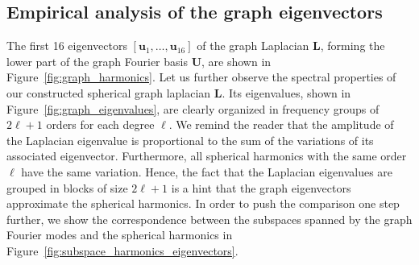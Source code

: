 \documentclass{article} %
\newcommand{\figref}[1]{Figure~\ref{fig:#1}}
\renewcommand{\b}[1]{{\bm{#1}}}   %
\newcommand{\1}{\b{1}}              %
\newcommand{\0}{\b{0}}              %
\renewcommand{\L}{\b{L}}
\newcommand{\U}{\b{U}}
\begin{document}
\subsection{Empirical analysis of the graph eigenvectors}

The first 16 eigenvectors $[\b u_1, \ldots, \b u_{16}]$ of the graph Laplacian $\L$, forming the lower part of the graph Fourier basis $\U$, are shown in \figref{graph_harmonics}.
Let us further observe the spectral properties of our constructed spherical graph laplacian $\L$.
Its eigenvalues, shown in \figref{graph_eigenvalues}, are clearly organized in frequency groups of $2\ell + 1$ orders for each degree $\ell$.
We remind the reader that the amplitude of the Laplacian eigenvalue is proportional to the sum of the variations of its associated eigenvector. Furthermore, all spherical harmonics with the same order $\ell$ have the same variation. Hence, the fact that the Laplacian eigenvalues are grouped in blocks of size $2\ell + 1$ is a hint that the graph eigenvectors approximate the spherical harmonics.
In order to push the comparison one step further, we show the correspondence between the subspaces spanned by the graph Fourier modes and the spherical harmonics in \figref{subspace_harmonics_eigenvectors}.
\end{document}
